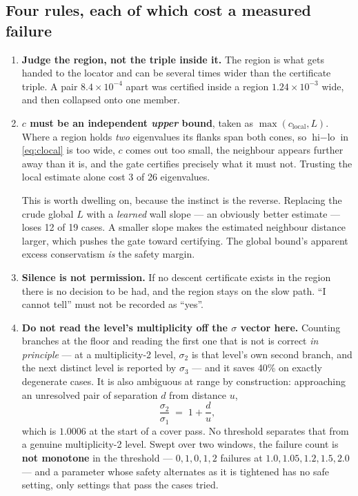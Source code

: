 \documentclass[11pt]{article}
\theoremstyle{definition}
\theoremstyle{remark}
\newcommand{\sig}{\sigma}
\begin{document}
\subsection{Four rules, each of which cost a measured failure}

\begin{enumerate}
\item \textbf{Judge the region, not the triple inside it.} The region is what gets handed to
the locator and can be several times wider than the certificate triple. A pair
$8.4\times10^{-4}$ apart was certified inside a region $1.24\times10^{-3}$ wide, and then
collapsed onto one member.

\item \textbf{$c$ must be an independent \emph{upper} bound}, taken as
$\max(c_{\text{local}}, L)$. Where a region holds \emph{two} eigenvalues its flanks span both
cones, so $\text{hi}-\text{lo}$ in \eqref{eq:clocal} is too wide, $c$ comes out too small, the
neighbour appears further away than it is, and the gate certifies precisely what it must not.
Trusting the local estimate alone cost 3 of 26 eigenvalues.

This is worth dwelling on, because the instinct is the reverse. Replacing the crude global $L$
with a \emph{learned} wall slope --- an obviously better estimate --- loses 12 of 19 cases. A
smaller slope makes the estimated neighbour distance larger, which pushes the gate toward
certifying. The global bound's apparent excess conservatism \emph{is} the safety margin.

\item \textbf{Silence is not permission.} If no descent certificate exists in the region there
is no decision to be had, and the region stays on the slow path. ``I cannot tell'' must not be
recorded as ``yes''.

\item \textbf{Do not read the level's multiplicity off the $\sig$ vector here.} Counting
branches at the floor and reading the first one that is not is correct \emph{in principle} ---
at a multiplicity-2 level, $\sig_2$ is that level's own second branch, and the next distinct
level is reported by $\sig_3$ --- and it saves 40\% on exactly degenerate cases. It is also
ambiguous at range by construction: approaching an unresolved pair of separation $d$ from
distance $u$,
\begin{equation}\label{eq:ambiguous}
  \frac{\sig_2}{\sig_1} \;=\; 1 + \frac{d}{u},
\end{equation}
which is $1.0006$ at the start of a cover pass. No threshold separates that from a genuine
multiplicity-2 level. Swept over two windows, the failure count is \textbf{not monotone} in the
threshold --- $0,1,0,1,2$ failures at $1.0,1.05,1.2,1.5,2.0$ --- and a parameter whose safety
alternates as it is tightened has no safe setting, only settings that pass the cases tried.
\end{enumerate}
\end{document}
